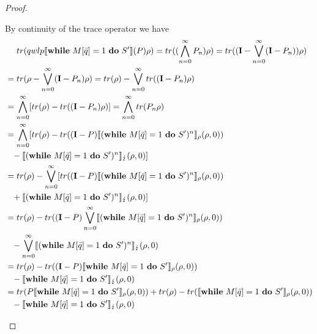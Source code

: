 \documentclass[a4paper,UKenglish,cleveref, autoref, thm-restate]{lipics-v2021}
\begin{document}
\begin{proof}
\begin{itemize}
        By continuity of the trace operator we have
        \begin{align*}
            &\phantom{=.}tr(\qwlp{\while'}{P}\rho)= tr((\bigwedge_{n=0}^\infty P_n) \rho) = tr((\identityOp - \bigvee_{n=0}^\infty (\identityOp-P_n)) \rho)\\
            &= tr(\rho - \bigvee_{n=0}^\infty (\identityOp-P_n)\rho)=tr(\rho)- \bigvee_{n=0}^\infty tr((\identityOp-P_n)\rho)\\
            &= \bigwedge_{n=0}^\infty [tr(\rho)-tr((\identityOp-P_n)\rho)]= \bigwedge_{n=0}^\infty tr(P_n\rho)\\
            &= \bigwedge_{n=0}^\infty [tr(\rho)- tr((\identityOp-P)\semanticsRho{(\while')^n}(\rho,0)) \\
            &\phantom{=}- \semanticsErr{(\while')^n}(\rho,0)]\\
            &= tr(\rho)- \bigvee_{n=0}^\infty [tr((\identityOp-P)\semanticsRho{(\while')^n}(\rho,0)) \\
            &\phantom{=}+ \semanticsErr{(\while')^n}(\rho,0)]\\
            &= tr(\rho)- tr((\identityOp-P)\bigvee_{n=0}^\infty \semanticsRho{(\while')^n}(\rho,0)) \\
            &\phantom{=}- \bigvee_{n=0}^\infty\semanticsErr{(\while')^n}(\rho,0)\\
            &= tr(\rho)- tr((\identityOp-P)\semanticsRho{\while'}(\rho,0)) \\
            &\phantom{=}- \semanticsErr{\while'}(\rho,0)\\
            &= tr(P \semanticsRho{\while'}(\rho,0)) + tr(\rho)-tr(\semanticsRho{\while'}(\rho,0))\\
            &\phantom{=}- \semanticsErr{\while'}(\rho,0)
        \end{align*}
    \end{itemize}
\end{proof}
\end{document}
